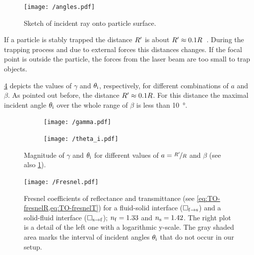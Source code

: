 \begin{figure}[thp]
  \centering
  \texttt{[image: /angles.pdf]}
  \caption{Sketch of incident ray onto particle surface.}
  \label{fig:TO-angles}
\end{figure}

If a particle is stably trapped the distance $R^{\prime}$ is about $R^{\prime} 
\approx 0.1R$~\cite{Lamprecht2017}. During the trapping process and due to 
external forces this distances changes. If the focal point is outside the 
particle, the forces from the laser beam are too small to trap objects.

\cref{fig:TO-gamma_theta} depicts the values of $\gamma$ and $\theta_{\mathrm{i}}$, 
respectively, for different combinations of $a$ and $\beta$. As pointed out 
before, the distance $R^{\prime} \approx 0.1R$. For this distance the maximal 
incident angle $\theta_{\mathrm{i}}$ over the whole range of $\beta$ is less than 
\SI{10}{\degree}.

\begin{figure}
  \centering
  \begin{subfigure}[b]{0.45\textwidth}
    \centering
    \texttt{[image: /gamma.pdf]}
    \caption{}
    \label{fig:TO-gamma}
  \end{subfigure}
  \hfill
  \begin{subfigure}[b]{0.45\textwidth}
    \centering
    \texttt{[image: /theta\_i.pdf]}
    \caption{}
    \label{fig:TO-theta_i}
  \end{subfigure}
    \caption{Magnitude of $\gamma$ and $\theta_{\mathrm{i}}$ for different values of 
    $a=\nicefrac{R^{\prime}}{R}$ and $\beta$ (see also \cref{fig:TO-angles}).}
  \label{fig:TO-gamma_theta}
\end{figure}

\begin{figure}[tbp]
  \centering
  \texttt{[image: /Fresnel.pdf]}
  \caption{Fresnel coefficients of reflectance and transmittance (see 
    \cref{eq:TO-fresnelR,eq:TO-fresnelT}) for a fluid-solid interface 
    ($\Box_{\mathrm{f}\rightarrow\mathrm{s}}$) and a solid-fluid interface 
    ($\Box_{\mathrm{s}\rightarrow\mathrm{f}}$); $n_{\mathrm{f}}=1.33$ and $n_{\mathrm{s}}=1.42$. The right 
    plot is a detail of the left one with a logarithmic y-scale. The gray 
    shaded area marks the interval of incident angles $\theta_{\mathrm{i}}$ that do not 
  occur in our setup.}
  \label{fig:TO-fresnel}
\end{figure}

